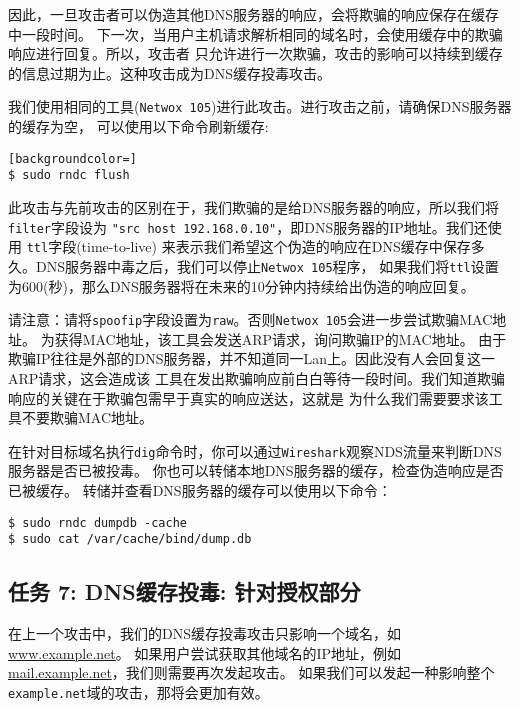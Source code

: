 因此，一旦攻击者可以伪造其他DNS服务器的响应，\apollo 会将欺骗的响应保存在缓存中一段时间。
下一次，当用户主机请求解析相同的域名时，\apollo 会使用缓存中的欺骗响应进行回复。所以，攻击者
只允许进行一次欺骗，攻击的影响可以持续到缓存的信息过期为止。这种攻击成为DNS缓存投毒攻击。

我们使用相同的工具(\texttt{Netwox 105})进行此攻击。进行攻击之前，请确保DNS服务器的缓存为空，
可以使用以下命令刷新缓存:

\begin{lstlisting}[backgroundcolor=]
$ sudo rndc flush
\end{lstlisting}

此攻击与先前攻击的区别在于，我们欺骗的是给DNS服务器的响应，所以我们将{\tt filter}字段设为
\texttt{"src host 192.168.0.10"}，即DNS服务器的IP地址。我们还使用 {\tt ttl}字段(time-to-live)
来表示我们希望这个伪造的响应在DNS缓存中保存多久。DNS服务器中毒之后，我们可以停止{\tt Netwox 105}程序，
如果我们将{\tt ttl}设置为600(秒)，那么DNS服务器将在未来的10分钟内持续给出伪造的响应回复。

请注意：请将{\tt spoofip}字段设置为{\tt raw}。否则{\tt Netwox 105}会进一步尝试欺骗MAC地址。
为获得MAC地址，该工具会发送ARP请求，询问欺骗IP的MAC地址。
由于欺骗IP往往是外部的DNS服务器，并不知道同一Lan上。因此没有人会回复这一ARP请求，这会造成该
工具在发出欺骗响应前白白等待一段时间。我们知道欺骗响应的关键在于欺骗包需早于真实的响应送达，这就是
为什么我们需要要求该工具不要欺骗MAC地址。

在针对目标域名执行\texttt{dig}命令时，你可以通过{\tt Wireshark}观察NDS流量来判断DNS服务器是否已被投毒。
你也可以转储本地DNS服务器的缓存，检查伪造响应是否已被缓存。
转储并查看DNS服务器的缓存可以使用以下命令：


\begin{lstlisting}
$ sudo rndc dumpdb -cache
$ sudo cat /var/cache/bind/dump.db
\end{lstlisting}



\subsection{任务 7: DNS缓存投毒: 针对授权部分}

在上一个攻击中，我们的DNS缓存投毒攻击只影响一个域名，如\url{www.example.net}。
如果用户尝试获取其他域名的IP地址，例如\url{mail.example.net}，我们则需要再次发起攻击。
如果我们可以发起一种影响整个\texttt{example.net}域的攻击，那将会更加有效。

